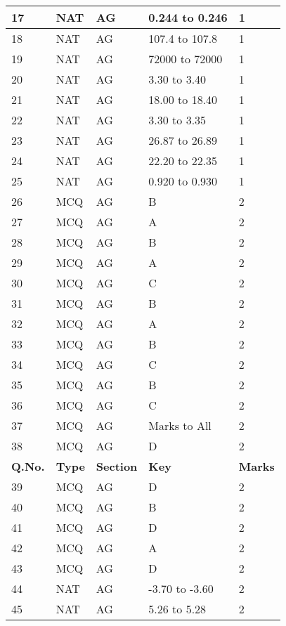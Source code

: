 \documentclass[12pt]{article}
\begin{document}
\begin{center}
\begin{longtable}{|p{2.5cm}|p{2.5cm}|p{2.5cm}|p{6cm}|p{2.5cm}|}
			\hline
			17 & NAT & AG & 0.244 to 0.246 & 1 \\
			\hline
			18 & NAT & AG & 107.4 to 107.8 & 1 \\
			\hline
			19 & NAT & AG & 72000 to 72000 & 1 \\
			\hline
			20 & NAT & AG & 3.30 to 3.40 & 1 \\
			\hline
			21 & NAT & AG & 18.00 to 18.40 & 1 \\
			\hline
			22 & NAT & AG & 3.30 to 3.35 & 1 \\
			\hline
			23 & NAT & AG & 26.87 to 26.89 & 1 \\
			\hline
			24 & NAT & AG & 22.20 to 22.35 & 1 \\
			\hline
			25 & NAT & AG & 0.920 to 0.930 & 1 \\
			\hline
			26 & MCQ & AG & B & 2 \\
			\hline
			27 & MCQ & AG & A & 2 \\
			\hline
			28 & MCQ & AG & B & 2 \\
			\hline
			29 & MCQ & AG & A & 2 \\
			\hline
			30 & MCQ & AG & C & 2 \\
			\hline
			31 & MCQ & AG & B & 2 \\
			\hline
			32 & MCQ & AG & A & 2 \\
			\hline
			33 & MCQ & AG & B & 2 \\
			\hline
			34 & MCQ & AG & C & 2 \\
			\hline
			35 & MCQ & AG & B & 2 \\
			\hline
			36 & MCQ & AG & C & 2 \\
			\hline
			37 & MCQ & AG & Marks to All & 2 \\
			\hline
			38 & MCQ & AG & D & 2 \\
			\hline
			\newpage
			\hline
			\rowcolor{gray!30}
			\textbf{Q.No.} & \textbf{Type} & \textbf{Section} & \textbf{Key} & \textbf{Marks} \\
			\hline
			39 & MCQ & AG & D & 2 \\
			\hline
			40 & MCQ & AG & B & 2 \\
			\hline
			41 & MCQ & AG & D & 2 \\
			\hline
			42 & MCQ & AG & A & 2 \\
			\hline
			43 & MCQ & AG & D & 2 \\
			\hline
			44 & NAT & AG & -3.70 to -3.60 & 2 \\
			\hline
			45 & NAT & AG & 5.26 to 5.28 & 2 \\
			\hline

\end{longtable}
\end{center}
\end{document}
